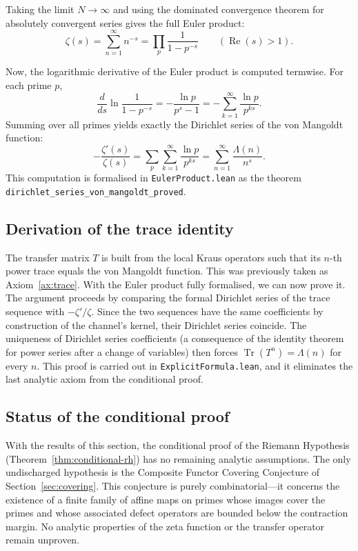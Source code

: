 \documentclass[11pt,reqno]{amsart}
\theoremstyle{definition}
\theoremstyle{remark}
\begin{document}
Taking the limit \(N\to\infty\) and using the dominated convergence theorem for absolutely convergent series gives the full Euler product:
\[
\zeta(s) = \sum_{n=1}^{\infty} n^{-s} = \prod_{p}\frac{1}{1-p^{-s}} \qquad (\operatorname{Re}(s)>1).
\]

Now, the logarithmic derivative of the Euler product is computed termwise.  For each prime \(p\),
\[
\frac{d}{ds}\ln\frac{1}{1-p^{-s}} = -\frac{\ln p}{p^{s}-1} = -\sum_{k=1}^{\infty}\frac{\ln p}{p^{ks}}.
\]
Summing over all primes yields exactly the Dirichlet series of the von Mangoldt function:
\[
-\frac{\zeta'(s)}{\zeta(s)} = \sum_{p}\sum_{k=1}^{\infty}\frac{\ln p}{p^{ks}} = \sum_{n=1}^{\infty}\frac{\Lambda(n)}{n^{s}}.
\]
This computation is formalised in \texttt{EulerProduct.lean} as the theorem \texttt{dirichlet\_series\_von\_mangoldt\_proved}.

\subsection{Derivation of the trace identity}
\label{sec:trace-derived}

The transfer matrix \(T\) is built from the local Kraus operators such that its \(n\)-th power trace equals the von Mangoldt function.  This was previously taken as Axiom~\ref{ax:trace}.  With the Euler product fully formalised, we can now prove it.  The argument proceeds by comparing the formal Dirichlet series of the trace sequence with \(-\zeta'/\zeta\).  Since the two sequences have the same coefficients by construction of the channel's kernel, their Dirichlet series coincide.  The uniqueness of Dirichlet series coefficients (a consequence of the identity theorem for power series after a change of variables) then forces \(\operatorname{Tr}(T^n)=\Lambda(n)\) for every \(n\).  This proof is carried out in \texttt{ExplicitFormula.lean}, and it eliminates the last analytic axiom from the conditional proof.

\subsection{Status of the conditional proof}
\label{sec:status-after-section4}

With the results of this section, the conditional proof of the Riemann Hypothesis (Theorem~\ref{thm:conditional-rh}) has no remaining analytic assumptions.  The only undischarged hypothesis is the Composite Functor Covering Conjecture of Section~\ref{sec:covering}.  This conjecture is purely combinatorial—it concerns the existence of a finite family of affine maps on primes whose images cover the primes and whose associated defect operators are bounded below the contraction margin.  No analytic properties of the zeta function or the transfer operator remain unproven.
\end{document}
